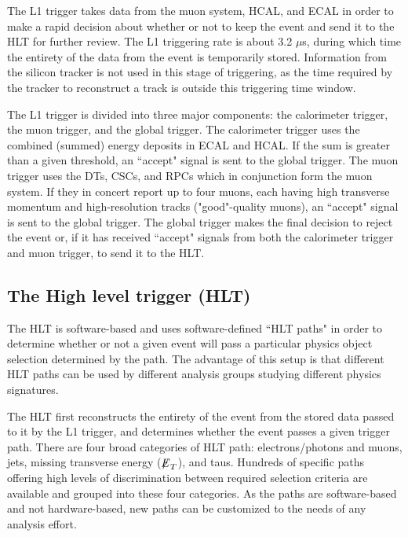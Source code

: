 The L1 trigger takes data from the muon system, HCAL, and ECAL in order to make a rapid decision about whether or not to keep the event and send it to the HLT for further review. The L1 triggering rate is about 3.2 $\mu$s, during which time the entirety of the data from the event is temporarily stored. Information from the silicon tracker is not used in this stage of triggering, as the time required by the tracker to reconstruct a track is outside this triggering time window. 

The L1 trigger is divided into three major components: the calorimeter trigger, the muon trigger, and the global trigger. The calorimeter trigger uses the combined (summed) energy deposits in ECAL and HCAL. If the sum is greater than a given threshold, an ``accept" signal is sent to the global trigger. The muon trigger uses the DTs, CSCs, and RPCs which in conjunction form the muon system. If they in concert report up to four muons, each having high transverse momentum and high-resolution tracks ("good"-quality muons), an ``accept" signal is sent to the global trigger. The global trigger makes the final decision to reject the event or, if it has received ``accept" signals from both the calorimeter trigger and muon trigger, to send it to the HLT.

\subsection{The High level trigger (HLT)}

The HLT is software-based and uses software-defined ``HLT paths" in order to determine whether or not a given event will pass a particular physics object selection determined by the path. The advantage of this setup is that different HLT paths can be used by different analysis groups studying different physics signatures.

The HLT first reconstructs the entirety of the event from the stored data passed to it by the L1 trigger, and determines whether the event passes a given trigger path. There are four broad categories of HLT path: electrons/photons and muons, jets, missing transverse energy (${\not\mathrel{E}}_T$), and taus. Hundreds of specific paths offering high levels of discrimination between required selection criteria are available and grouped into these four categories. As the paths are software-based and not hardware-based, new paths can be customized to the needs of any analysis effort.

